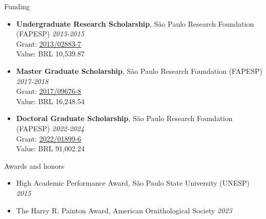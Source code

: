 \documentclass{resume}
\begin{document}
\begin{rSection}{Funding} 
\begin{itemize}
\item {\bf Undergraduate Research Scholarship}{, São Paulo Research Foundation (FAPESP)
} \hfill{\em 2013-2015}\\
Grant: \href{https://bv.fapesp.br/en/bolsas/142421/effect-of-fragmentation-on-the-persistence-of-anuran-amphibians-amphibia-anura-within-the-atlanti/}{\underline{2013/02883-7}}\\
Value: BRL 10,539.87

\item {\bf Master Graduate Scholarship}{, São Paulo Research Foundation (FAPESP)
} \hfill{\em 2017-2018}\\
Grant: \href{https://bv.fapesp.br/en/bolsas/172826/effect-of-landscape-modifications-and-climate-changes-on-the-persistence-of-amphibians-in-the-atlant/}{\underline{2017/09676-8}}\\
Value: BRL 16,248.54

\item {\bf Doctoral Graduate Scholarship}{, São Paulo Research Foundation (FAPESP)
} \hfill{\em 2022-2024}\\
Grant: \href{https://bv.fapesp.br/en/bolsas/203713/landscape-structure-as-a-predictor-of-taxonomic-and-functional-diversity-of-amphibians-in-the-atlant/}{\underline{2022/01899-6}}\\
Value: BRL 91,002.24
\end{itemize}
\end{rSection}


\begin{rSection}{Awards and honors} 
\begin{itemize}
\item {High Academic Performance Award, São Paulo State University (UNESP)} \hfill{\em 2015}
\item {The Harry R. Painton Award, American Ornithological Society} \hfill{\em 2023}
\end{itemize}
\end{rSection}

\end{document}
